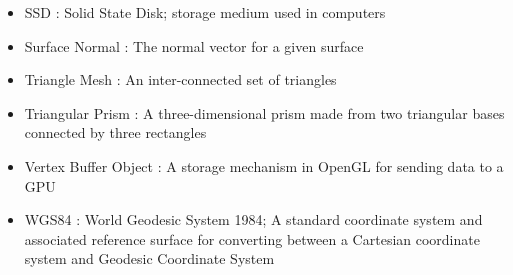 \begin{itemize}
   \item SSD : Solid State Disk; storage medium used in computers
   \item Surface Normal : The normal vector for a given surface
   \item Triangle Mesh : An inter-connected set of triangles
   \item Triangular Prism : A three-dimensional prism made from two triangular bases connected by three rectangles
   \item Vertex Buffer Object : A storage mechanism in OpenGL for sending data to a GPU
   \item WGS84 : World Geodesic System 1984; A standard coordinate system and associated reference surface for converting between a Cartesian coordinate system and Geodesic Coordinate System
\end{itemize}